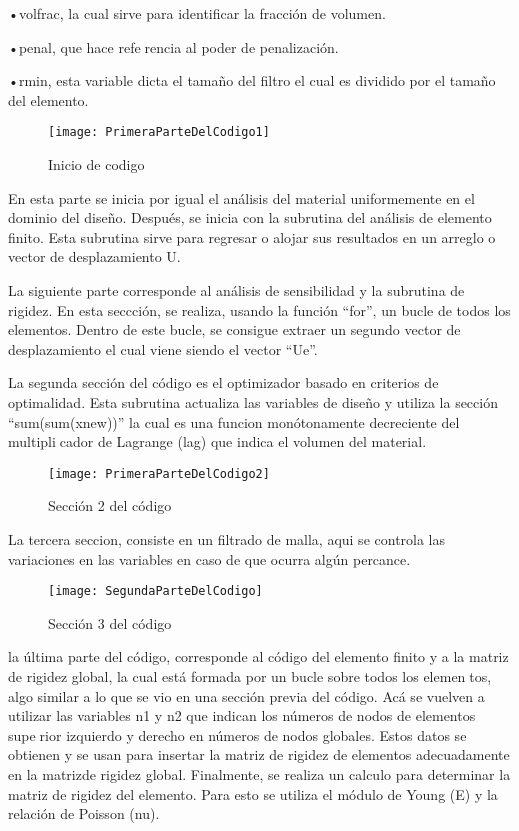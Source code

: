 \documentclass{article}
\begin{document}
•volfrac, la cual sirve para identificar la fracción de volumen. 

•penal, que hace referencia al poder de penalización. 

•rmin, esta variable dicta el tamaño del filtro el cual es dividido por el tamaño del elemento.

\begin{figure}[H] %
    \centering
    \texttt{[image: PrimeraParteDelCodigo1]} %
    \caption{Inicio de codigo}   
   \label{!}
\end{figure}

En esta parte se inicia por igual el análisis del material uniformemente en el dominio del diseño. Después, se inicia con la subrutina del análisis de elemento finito. Esta subrutina sirve para regresar o alojar sus resultados en un arreglo o vector de desplazamiento U.

La siguiente parte corresponde al análisis de sensibilidad y la subrutina de rigidez. En esta seccción, se realiza, usando la función “for”, un bucle de todos los elementos. Dentro de este bucle, se consigue extraer un segundo vector de desplazamiento el cual viene 
siendo el vector “Ue”. 


La segunda sección del código es el optimizador basado en criterios de optimalidad. 
Esta subrutina actualiza las variables de diseño y utiliza la sección 
“sum(sum(xnew))” la cual es una funcion monótonamente decreciente del multiplicador de Lagrange (lag) que indica el volumen del material.

\begin{figure}[H] %
    \centering
    \texttt{[image: PrimeraParteDelCodigo2]} %
    \caption{Sección 2 del código}   
   \label{!}
\end{figure}

La tercera seccion, consiste en un filtrado de malla, aqui se controla las variaciones en las variables en caso de que ocurra algún percance.

\begin{figure}[H] %
    \centering
    \texttt{[image: SegundaParteDelCodigo]} %
    \caption{Sección 3 del código}   
   \label{!}
\end{figure}

la última parte del código, corresponde al código del elemento finito y a la 
matriz de rigidez global, la cual está formada por un bucle sobre todos los elementos, algo similar a lo que se vio en una sección previa del código. Acá se vuelven a 
utilizar las variables n1 y n2 que indican los números de nodos de elementos superior izquierdo y derecho en números de nodos globales. Estos datos se obtienen y 
se usan para insertar la matriz de rigidez de elementos adecuadamente en la matrizde rigidez global. Finalmente, se realiza un calculo para determinar la matriz de rigidez del elemento. Para esto se utiliza el módulo de Young (E) y la relación de 
Poisson (nu).
\end{document}
